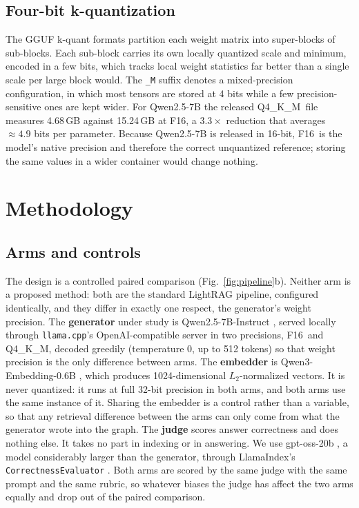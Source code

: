 \documentclass[conference, table]{IEEEtran}
\newcommand{\fsixteen}{F16}
\newcommand{\qfour}{Q4\_K\_M}
\begin{document}
\subsection{Four-bit k-quantization}

\noindent
The GGUF k-quant formats \cite{gguf,sparrenberg2025llamacpp} partition each weight matrix into super-blocks of sub-blocks. Each sub-block carries its own locally quantized scale and minimum, encoded in a few bits, which tracks local weight statistics far better than a single scale per large block would. The \texttt{\_M} suffix denotes a mixed-precision configuration, in which most tensors are stored at 4 bits while a few precision-sensitive ones are kept wider. For Qwen2.5-7B the released \qfour\ file measures 4.68\,GB against 15.24\,GB at \fsixteen, a $3.3\times$ reduction that averages $\approx\!4.9$ bits per parameter. Because Qwen2.5-7B is released in 16-bit, \fsixteen\ is the model's native precision and therefore the correct unquantized reference; storing the same values in a wider container would change nothing.

\section{Methodology}\label{sec:design}

\subsection{Arms and controls}

\noindent
The design is a controlled paired comparison (Fig.~\ref{fig:pipeline}b). Neither arm is a proposed method: both are the standard LightRAG pipeline, configured identically, and they differ in exactly one respect, the generator's weight precision. The \textbf{generator} under study is Qwen2.5-7B-Instruct \cite{qwen25}, served locally through \texttt{llama.cpp}'s OpenAI-compatible server \cite{llamacpp} in two precisions, \fsixteen\ and \qfour, decoded greedily (temperature $0$, up to 512 tokens) so that weight precision is the only difference between arms. The \textbf{embedder} is Qwen3-Embedding-0.6B \cite{qwen3embedding,sentencebert2019}, which produces 1024-dimensional $L_2$-normalized vectors. It is never quantized: it runs at full 32-bit precision in both arms, and both arms use the same instance of it. Sharing the embedder is a control rather than a variable, so that any retrieval difference between the arms can only come from what the generator wrote into the graph. The \textbf{judge} scores answer correctness and does nothing else. It takes no part in indexing or in answering. We use gpt-oss-20b \cite{gptoss2025}, a model considerably larger than the generator, through LlamaIndex's \texttt{CorrectnessEvaluator} \cite{llamaindex}. Both arms are scored by the same judge with the same prompt and the same rubric, so whatever biases the judge has affect the two arms equally and drop out of the paired comparison.
\end{document}

